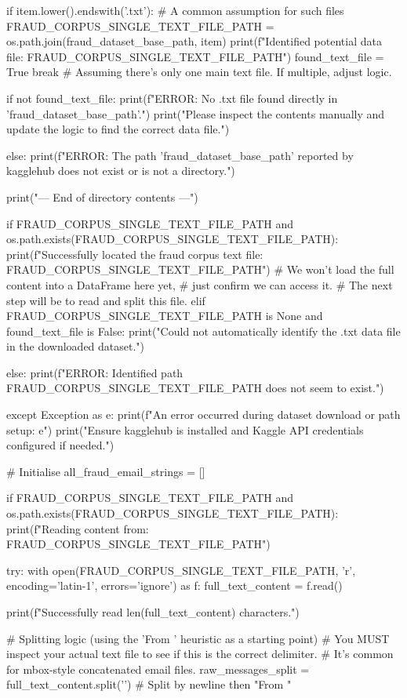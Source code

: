 \begin{ffcode}
            if item.lower().endswith('.txt'): # A common assumption for such files
                FRAUD_CORPUS_SINGLE_TEXT_FILE_PATH = os.path.join(fraud_dataset_base_path, item)
                print(f"Identified potential data file: {FRAUD_CORPUS_SINGLE_TEXT_FILE_PATH}")
                found_text_file = True
                break # Assuming there's only one main text file. If multiple, adjust logic.

        if not found_text_file:
            print(f"ERROR: No .txt file found directly in '{fraud_dataset_base_path}'.")
            print("Please inspect the contents manually and update the logic to find the correct data file.")

    else:
        print(f"ERROR: The path '{fraud_dataset_base_path}' reported by kagglehub does not exist or is not a directory.")

    print("--- End of directory contents ---\n")

    if FRAUD_CORPUS_SINGLE_TEXT_FILE_PATH and os.path.exists(FRAUD_CORPUS_SINGLE_TEXT_FILE_PATH):
        print(f"Successfully located the fraud corpus text file: {FRAUD_CORPUS_SINGLE_TEXT_FILE_PATH}")
        # We won't load the full content into a DataFrame here yet,
        # just confirm we can access it.
        # The next step will be to read and split this file.
    elif FRAUD_CORPUS_SINGLE_TEXT_FILE_PATH is None and found_text_file is False:
         print("Could not automatically identify the .txt data file in the downloaded dataset.")

    else:
        print(f"ERROR: Identified path {FRAUD_CORPUS_SINGLE_TEXT_FILE_PATH} does not seem to exist.")


except Exception as e:
    print(f"An error occurred during dataset download or path setup: {e}")
    print("Ensure kagglehub is installed and Kaggle API credentials configured if needed.")

# Initialise
all_fraud_email_strings = []
    
    if FRAUD_CORPUS_SINGLE_TEXT_FILE_PATH and os.path.exists(FRAUD_CORPUS_SINGLE_TEXT_FILE_PATH):
        print(f"Reading content from: {FRAUD_CORPUS_SINGLE_TEXT_FILE_PATH}")
    
        try:
            with open(FRAUD_CORPUS_SINGLE_TEXT_FILE_PATH, 'r', encoding='latin-1', errors='ignore') as f:
                full_text_content = f.read()
    
            print(f"Successfully read {len(full_text_content)} characters.")
    
            # Splitting logic (using the 'From ' heuristic as a starting point)
            # You MUST inspect your actual text file to see if this is the correct delimiter.
            # It's common for mbox-style concatenated email files.
            raw_messages_split = full_text_content.split('\nFrom ') # Split by newline then "From "
    

\end{ffcode}
